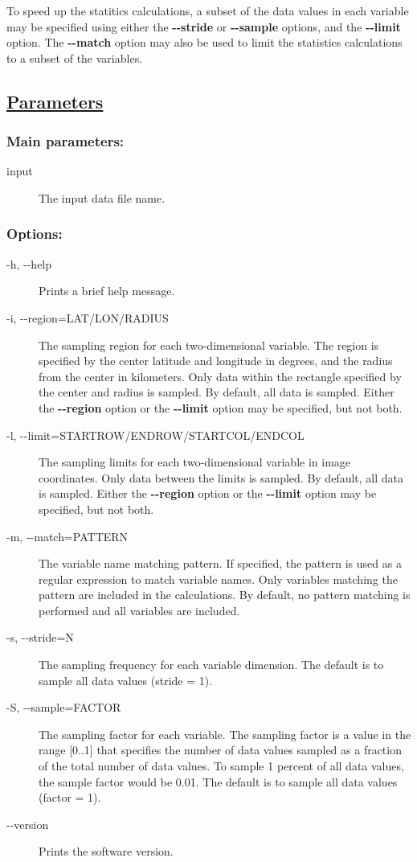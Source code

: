  To speed up the statitics calculations, a subset of the data values in each variable may be specified using either the \textbf{-{-}stride}
 or \textbf{-{-}sample}
 options, and the \textbf{-{-}limit}
 option. The \textbf{-{-}match}
 option may also be used to limit the statistics calculations to a subset of the variables. 
\subsection*{\underline{Parameters}}
\subsubsection*{Main parameters:}
\begin{description}
\item[input]The input data file name.

\end{description}
\subsubsection*{Options:}
\begin{description}
\item[ -h, -{-}help ] Prints a brief help message. 
\item[ -i, -{-}region=LAT/LON/RADIUS] The sampling region for each two-dimensional variable. The region is specified by the center latitude and longitude in degrees, and the radius from the center in kilometers. Only data within the rectangle specified by the center and radius is sampled. By default, all data is sampled. Either the \textbf{-{-}region}
 option or the \textbf{-{-}limit}
 option may be specified, but not both.
\item[ -l, -{-}limit=STARTROW/ENDROW/STARTCOL/ENDCOL] The sampling limits for each two-dimensional variable in image coordinates. Only data between the limits is sampled. By default, all data is sampled. Either the \textbf{-{-}region}
 option or the \textbf{-{-}limit}
 option may be specified, but not both.
\item[ -m, -{-}match=PATTERN ] The variable name matching pattern. If specified, the pattern is used as a regular expression to match variable names. Only variables matching the pattern are included in the calculations. By default, no pattern matching is performed and all variables are included. 
\item[ -s, -{-}stride=N ] The sampling frequency for each variable dimension. The default is to sample all data values (stride = 1). 
\item[ -S, -{-}sample=FACTOR ] The sampling factor for each variable. The sampling factor is a value in the range [0..1] that specifies the number of data values sampled as a fraction of the total number of data values. To sample 1 percent of all data values, the sample factor would be 0.01. The default is to sample all data values (factor = 1). 
\item[-{-}version]Prints the software version.

\end{description}
